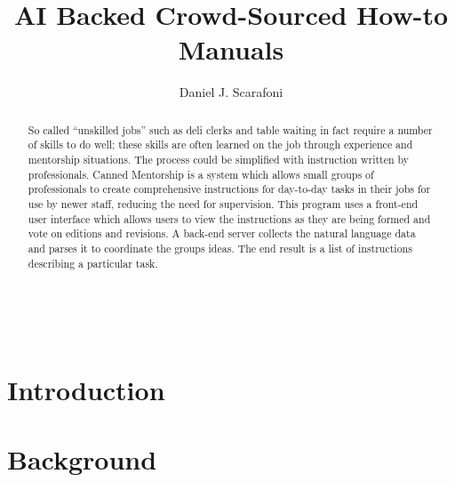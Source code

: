 \documentclass[11pt,leqno]{report}
\begin{document}
\sloppy
\title{AI Backed Crowd-Sourced How-to Manuals}
\author{Daniel J. Scarafoni}
\maketitle


\thispagestyle{empty}
\newenvironment{dedication}
{\cleardoublepage \thispagestyle{empty} \vspace*{\stretch{1}}
  \begin{center} \em}
  {\end{center} \vspace*{\stretch{3}} }


\begin{abstract}
	So called “unskilled jobs” such as deli clerks and table waiting in fact require a number of skills to do well; these skills are often learned on the job through experience and mentorship situations. The process could be simplified with instruction written by professionals. Canned Mentorship is a system which allows small groups of professionals to create comprehensive instructions for day-to-day tasks in their jobs for use by newer staff, reducing the need for supervision. This program uses a front-end user interface which allows users to view the instructions as they are being formed and vote on editions and revisions. A back-end server collects the natural language data and parses it to coordinate the groups ideas. The end result is a list of instructions describing a particular task.
\end{abstract}

\tableofcontents
\pagebreak\

\begin{comment}
introduction
	-crowd sourcing has been used to answer questions
	-crowd sourcing has been used to annotate instructions
	-crowd sourcing instructions has been lacking
	
\end{comment}

\chapter{Introduction}


\chapter{Background}

\end{document}
